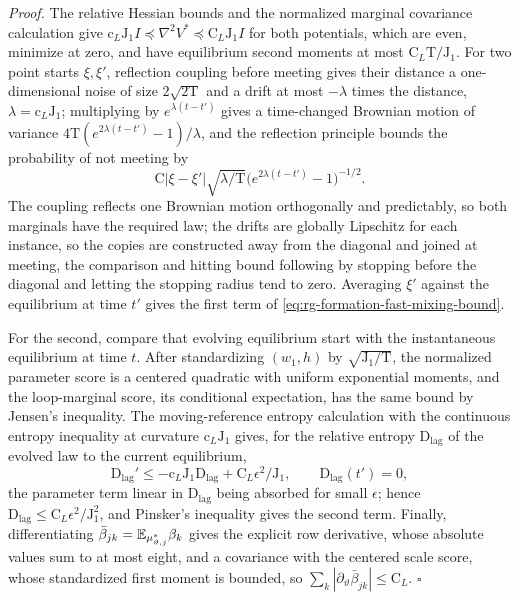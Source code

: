 \noindent\emph{Proof.}
The relative Hessian bounds and the normalized marginal covariance calculation
give \(\mathrm c_L\mathrm J_1I\preceq\nabla^2V^*\preceq\mathrm C_L\mathrm J_1I\)
for both potentials, which are even, minimize at zero, and have equilibrium
second moments at most \(\mathrm C_L\mathrm T/\mathrm J_1\). For two point
starts \(\xi,\xi'\), reflection coupling before meeting gives their distance a
one-dimensional noise of size \(2\sqrt{2\mathrm T}\) and a drift at most
\(-\lambda\) times the distance, \(\lambda=\mathrm c_L\mathrm J_1\); multiplying
by \(e^{\lambda(t-t')}\) gives a time-changed Brownian motion of variance
\(4\mathrm T(e^{2\lambda(t-t')}-1)/\lambda\), and the reflection principle
bounds the probability of not meeting by
\begin{equation}
 \mathrm C|\xi-\xi'|\sqrt{\lambda/\mathrm T}
                 \bigl(e^{2\lambda(t-t')}-1\bigr)^{-1/2}.
 \label{eq:rg-formation-reflection-bound}
\end{equation}
The coupling reflects one Brownian motion orthogonally and predictably, so
both marginals have the required law; the drifts are globally Lipschitz for
each instance, so the copies are constructed away from the diagonal and joined
at meeting, the comparison and hitting bound following by stopping before the
diagonal and letting the stopping radius tend to zero. Averaging \(\xi'\)
against the equilibrium at time \(t'\) gives the first term of
\cref{eq:rg-formation-fast-mixing-bound}.

For the second, compare that evolving equilibrium start with the
instantaneous equilibrium at time \(t\). After standardizing \((w_1,h)\) by
\(\sqrt{\mathrm J_1/\mathrm T}\), the normalized parameter score is a centered
quadratic with uniform exponential moments, and the loop-marginal score, its
conditional expectation, has the same bound by Jensen's inequality. The
moving-reference entropy calculation with the continuous entropy inequality at
curvature \(\mathrm c_L\mathrm J_1\) gives, for the relative entropy
\(\mathrm D_{\mathrm{lag}}\) of the evolved law to the current equilibrium,
\begin{equation}
 \mathrm D_{\mathrm{lag}}'\le-\mathrm c_L\mathrm J_1\mathrm D_{\mathrm{lag}}
 +\mathrm C_L\epsilon^2/\mathrm J_1,\qquad \mathrm D_{\mathrm{lag}}(t')=0,
 \label{eq:rg-formation-fast-equilibrium-lag}
\end{equation}
the parameter term linear in \(\mathrm D_{\mathrm{lag}}\) being absorbed for
small \(\epsilon\); hence \(\mathrm D_{\mathrm{lag}}\le\mathrm C_L\epsilon^2/\mathrm J_1^2\),
and Pinsker's inequality gives the second term. Finally, differentiating
\(\bar\beta_{jk}=\mathbb E_{\mu_{\vartheta,j}^*}\beta_k\) gives the explicit row
derivative, whose absolute values sum to at most eight, and a covariance with
the centered scale score, whose standardized first moment is bounded, so
\(\sum_k|\partial_\vartheta\bar\beta_{jk}|\le\mathrm C_L\). \hfill\(\square\)

